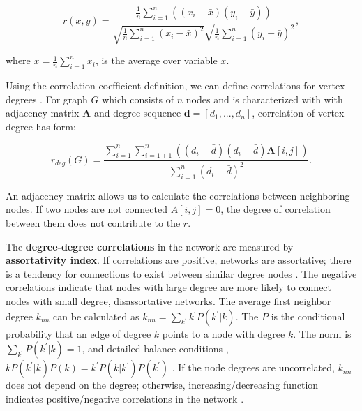 \begin{equation}
r(x, y) = \frac{\frac{1}{n}\sum_{i=1}^{n}((x_i - \bar{x} ) (y_i - \bar{y}) )}{\sqrt{\frac{1}{n}\sum_{i=1}^{n}(x_i - \bar{x})^2} \sqrt{\frac{1}{n}\sum_{i=1}^{n}(y_i - \bar{y})^2} },
\end{equation}

where $\bar{x} = \frac{1}{n}\sum_{i=1}^{n}x_i$, is the average over variable $x$.

Using the correlation coefficient definition, we can define correlations for vertex degrees \cite{van2010graph}. For graph $G$ which consists of $n$ nodes and is characterized with with adjacency matrix $\boldsymbol{A}$ and degree sequence $\boldsymbol{d} = [d_1, ..., d_n]$, correlation of vertex degree has form:


\begin{equation}
r_{deg}(G) = \frac{\sum_{i=1}^{n}\sum_{i=1+1}^{n}((d_i - \bar{d}) (d_i - \bar{d}) \boldsymbol{A}[i,j] )}{\sum_{i=1}^{n}(d_i - \bar{d})^2}.
\end{equation}

An adjacency matrix allows us to calculate the correlations between neighboring nodes. If two nodes are not connected $A[i,j]=0$, the degree of correlation between them does not contribute to the $r$.

The \textbf{degree-degree correlations} in the network are measured by \textbf{assortativity index}. If correlations are positive, networks are assortative; there is a tendency for connections to exist between similar degree nodes \cite{barabasi2016network}. The negative correlations indicate that nodes with large degree are more likely to connect nodes with small degree, disassortative networks. The average first neighbor degree $k_{nn}$ can be calculated as $k_{nn} = \sum_{k^{'}}k^{'}P(k^{'}|{k})$. The $P$ is the conditional probability that an edge of degree $k$ points to a node with degree $k$. The norm is $\sum_{k^{'}}P(k^{'}|k)=1$, and detailed balance conditions \cite{boccaletti2006complex},  $kP(k^{'}|k)P(k) = k^{'}P(k|k^{'})P(k^{'})$ \cite{boccaletti2006complex}. If the node degrees are uncorrelated, $k_{nn}$ does not depend on the degree; otherwise, increasing/decreasing function indicates positive/negative correlations in the network \cite{park2003}.


